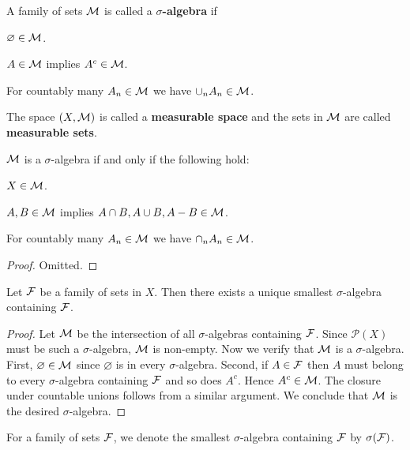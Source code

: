 \begin{definition}
    A family of sets $\mathcal{M}$ is called a \textbf{$\sigma$-algebra} if 
    \begin{thmenum}
        \item $\varnothing\in\mathcal{M}$.
        \item $A\in\mathcal{M}$ implies $A^c\in\mathcal{M}$.
        \item For countably many $A_n\in\mathcal{M}$ we have $\cup_n A_n\in\mathcal{M}$.
    \end{thmenum}
    The space $(X,\mathcal{M})$ is called a \textbf{measurable space} and 
    the sets in $\mathcal{M}$ are called \textbf{measurable sets}.
\end{definition} 

\begin{proposition}
    $\mathcal{M}$ is a $\sigma$-algebra if and only if the following hold: 
    \begin{thmenum}
        \item $X\in\mathcal{M}$.
        \item $A,B\in\mathcal{M}$ implies $A\cap B, A\cup B, A-B\in\mathcal{M}$.
        \item For countably many $A_n\in\mathcal{M}$ we have $\cap_n A_n\in\mathcal{M}$.
    \end{thmenum}
\end{proposition}
\begin{proof}
    Omitted.
\end{proof}

\begin{proposition}
    Let $\mathcal{F}$ be a family of sets in $X$. Then there exists a unique 
    smallest $\sigma$-algebra containing $\mathcal{F}$.
\end{proposition}
\begin{proof}
    Let $\mathcal{M}$ be the intersection of all $\sigma$-algebras containing 
    $\mathcal{F}$. Since $\mathcal{P}(X)$ must be such a $\sigma$-algebra, 
    $\mathcal{M}$ is non-empty. Now we verify that $\mathcal{M}$ is a $\sigma$-algebra. 
    First, $\varnothing\in\mathcal{M}$ since $\varnothing$ is in every 
    $\sigma$-algebra. Second, if $A\in\mathcal{F}$ then $A$ must belong to 
    every $\sigma$-algebra containing $\mathcal{F}$ and so does $A^c$. Hence 
    $A^c\in\mathcal{M}$. The closure under countable unions follows from 
    a similar argument. We conclude that $\mathcal{M}$ is the desired 
    $\sigma$-algebra.
\end{proof}

\begin{definition}
    For a family of sets $\mathcal{F}$, we denote the smallest $\sigma$-algebra 
    containing $\mathcal{F}$ by $\sigma(\mathcal{F})$.
\end{definition}

